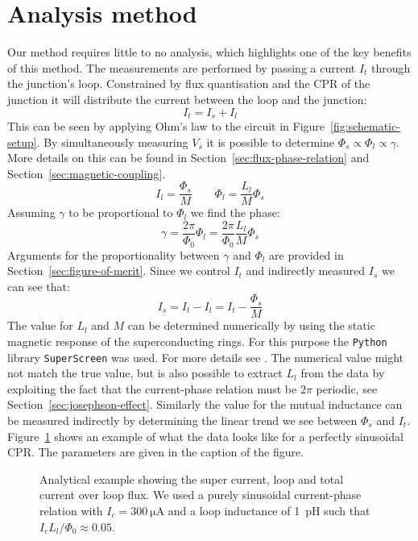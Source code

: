 \section{Analysis method}
\label{sec:analysis-method}
Our method requires little to no analysis, which highlights one of the key benefits of this method. The measurements are performed by passing a current $I_t$ through the junction's loop. Constrained by flux quantisation and the CPR of the junction it will distribute the current between the loop and the junction:
\begin{equation}
	I_t = I_s + I_l
\end{equation}
This can be seen by applying Ohm's law to the circuit in Figure~\ref{fig:schematic-setup}. By simultaneously measuring $V_s$ it is possible to determine $\Phi_s \propto \Phi_l \propto \gamma$. More details on this can be found in Section~\ref{sec:flux-phase-relation} and Section~\ref{sec:magnetic-coupling}.
\begin{equation}
	I_l = \frac{\Phi_s}{M} \qquad \Phi_l = \frac{L_l}{M}\Phi_s
\end{equation}
Assuming $\gamma$ to be proportional to $\Phi_l$ we find the phase:
\begin{equation}
	\gamma = \frac{2\pi}{\Phi_0}\Phi_l = \frac{2\pi}{\Phi_0}\frac{L_l}{M}\Phi_s
\end{equation}
Arguments for the proportionality between $\gamma$ and $\Phi_l$ are provided in Section~\ref{sec:figure-of-merit}. Since we control $I_t$ and indirectly measured $I_s$ we can see that:
\begin{equation}
	I_s = I_t - I_l = I_t - \frac{\Phi_s}{M}
\end{equation}
The value for $L_l$ and $M$ can be determined numerically by using the static magnetic response of the superconducting rings. For this purpose the \texttt{Python} library \texttt{SuperScreen} was used. For more details see \cite{bishop-vanhornSuperScreenOpensourcePackage2022}. The numerical value might not match the true value, but is also possible to extract $L_l$ from the data by exploiting the fact that the current-phase relation must be $2\pi$ periodic, see Section~\ref{sec:josephson-effect}. Similarly the value for the mutual inductance can be measured indirectly by determining the linear trend we see between $\Phi_s$ and $I_t$. Figure~\ref{fig:sinusoidal-CPR-prediction} shows an example of what the data looks like for a perfectly sinusoidal CPR. The parameters are given in the caption of the figure. 

\begin{figure}[ht!]
	\centering
	
	\caption{Analytical example showing the super current, loop and total current over loop flux. We used a purely sinusoidal current-phase relation with $I_c=\qty{300}{\micro\ampere}$ and a loop inductance of \qty{1}{\pico\henry} such that $I_c L_l / \Phi_0 \approx 0.05$.}
	\label{fig:sinusoidal-CPR-prediction}
\end{figure}

